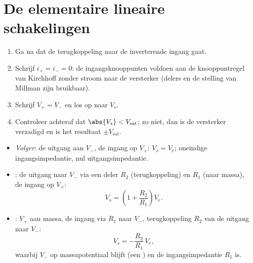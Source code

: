 \section{De elementaire lineaire schakelingen}

\begin{method}\label{met:b1:operational-amplifier:method}
\begin{enumerate}
  \item Ga na dat de terugkoppeling naar de inverterende ingang gaat.
  \item Schrijf $i_+ = i_- = 0$: de ingangsknooppunten voldoen aan de
        knooppuntregel van Kirchhoff zonder stroom naar de versterker (delers en de
        stelling van Millman zijn bruikbaar).
  \item Schrijf $V_+ = V_-$ en los op naar $V_s$.
  \item Controleer achteraf dat $\abs{V_s} < V_{\mathrm{sat}}$; zo niet, dan
        is de versterker verzadigd en is het resultaat $\pm V_{\mathrm{sat}}$.
\end{enumerate}
\end{method}

\begin{proposition}\label{prop:b1:operational-amplifier:basic}
\begin{itemize}
  \item \emph{Volger}: de uitgang aan $V_-$, de ingang op $V_+$:
        $V_s = V_e$; oneindige ingangsimpedantie, nul uitgangsimpedantie.
  \item \emph{}: de uitgang naar $V_-$ via een
        deler $R_2$ (terugkoppeling) en $R_1$ (naar massa), de ingang op $V_+$:
        \[
        V_s = \left(1 + \frac{R_2}{R_1}\right)V_e .
        \]
  \item \emph{}: $V_+$ aan massa, de ingang via
        $R_1$ naar $V_-$, terugkoppeling $R_2$ van de uitgang naar $V_-$:
        \[
        V_s = -\frac{R_2}{R_1}\,V_e ,
        \]
        waarbij $V_-$ op massapotentiaal blijft (een \emph{})
        en de ingangsimpedantie $R_1$ is.
\end{itemize}
\end{proposition}

